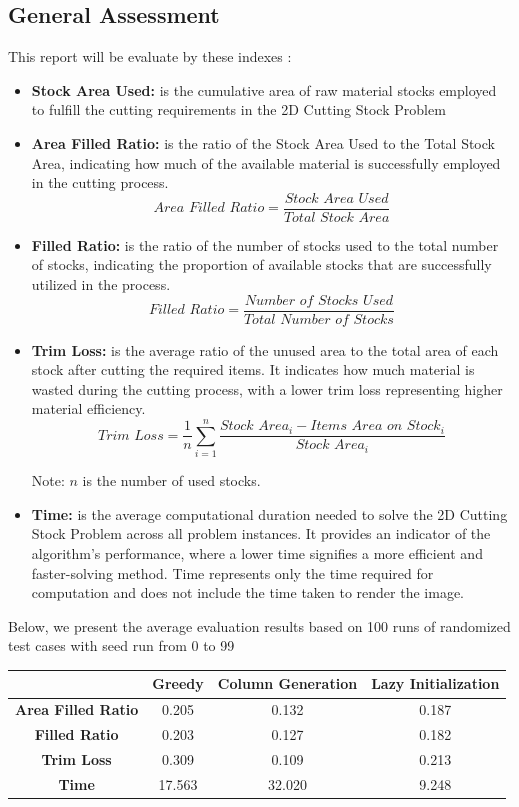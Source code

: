 \documentclass[a4paper]{article}
\begin{document}
\subsection{General Assessment}
This report will be evaluate by these indexes : 
\begin{itemize}
    \item \textbf{Stock Area Used: } is the cumulative area of raw material stocks employed to fulfill the cutting requirements in the 2D Cutting Stock Problem
    \item \textbf{Area Filled Ratio:}  is the ratio of the Stock Area Used to the Total Stock Area, indicating how much of the available material is successfully employed in the cutting process.
     \[
    \textit{Area Filled Ratio} = \frac{\textit{Stock Area Used}}{\textit{Total Stock Area}}
    \]
    \item \textbf{Filled Ratio:} is the ratio of the number of stocks used to the total number of stocks, indicating the proportion of available stocks that are successfully utilized in the process.
    \[
    \textit{Filled Ratio} = \frac{\textit{Number of Stocks Used}}{\textit{Total Number of Stocks}}
    \]
    \item \textbf{Trim Loss:} is the average ratio of the unused area to the total area of each stock after cutting the required items. It indicates how much material is wasted during the cutting process, with a lower trim loss representing higher material efficiency.
    \[
    \textit{Trim Loss} = \frac{1}{n} \sum_{i=1}^{n} \frac{\textit{Stock Area}_i - \textit{Items Area on Stock}_i}{\textit{Stock Area}_i}
    \]
    \begin{flushright}
        \centering
        \footnotesize{Note: \( n \) is the number of used stocks.}
    \end{flushright}
\item \textbf{Time:} is the average computational duration needed to solve the 2D Cutting Stock Problem across all problem instances. It provides an indicator of the algorithm’s performance, where a lower time signifies a more efficient and faster-solving method. Time represents only the time required for computation and does not include the time taken to render the image.
\end{itemize}
Below, we present the average evaluation results based on 100 runs of randomized test cases with seed run from 0 to 99

 \begin{table}[H]
        \centering
        \begin{tabular}{|c|c|c|c|}
            \hline
            \textbf{} & \textbf{Greedy} & \textbf{Column Generation} & \textbf{Lazy Initialization} \\ \hline
            \textbf{Area Filled Ratio} & 0.205 & 0.132 & 0.187 \\ \hline
            \textbf{Filled Ratio} & 0.203 & 0.127 & 0.182 \\ \hline
            \textbf{Trim Loss}  & 0.309 & 0.109 & 0.213 \\ \hline
            \textbf{Time} & 17.563 & 32.020 & 9.248 \\ \hline
        \end{tabular}
\end{table}
\FloatBarrier
\end{document}
